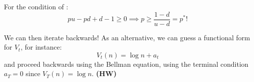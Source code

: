 For the condition of :
\begin{equation*}
    pu - pd + d - 1 \geq 0 \implies p \geq \frac{1 - d}{u - d} = p^*!
\end{equation*}

We can then iterate backwards!
As an alternative, we can guess a functional form for $V_t$, for instance:
\begin{equation*}
    V_t(n) = \log n + a_t
\end{equation*}
and proceed backwards using the Bellman equation, using the terminal condition $a_T = 0$ since $V_T(n) = \log n$. \textbf{\color{red}(HW)}